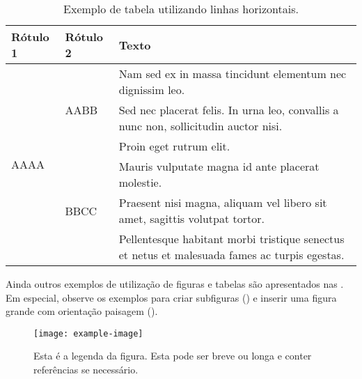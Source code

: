 \documentclass[portuguese]{textolivre}
\begin{document}
\begin{table}[htpb]
\caption{Exemplo de tabela utilizando linhas horizontais.}
\label{tbl02}
\begin{tabular}{llp{11cm}}
\toprule
Rótulo 1 & Rótulo 2 & Texto \\
\midrule
\multirow{6}{*}{AAAA} & \multirow{3}{*}{AABB} & Nam sed ex in massa tincidunt elementum nec dignissim leo.  \\
 \cmidrule{3-3}
 & & Sed nec placerat felis. In urna leo, convallis a nunc non, sollicitudin auctor nisi. \\
 \cmidrule{3-3}
 & & Proin eget rutrum elit. \\
 \cmidrule{2-3}
 & \multirow{3}{*}{BBCC} & Mauris vulputate magna id ante placerat molestie. \\
 \cmidrule{3-3}
 & & Praesent nisi magna, aliquam vel libero sit amet, sagittis volutpat tortor. \\
 \cmidrule{3-3}
 & & Pellentesque habitant morbi tristique senectus et netus et malesuada fames ac turpis egestas. \\
\bottomrule
\end{tabular}
\end{table}

\lipsum[3]

Ainda outros exemplos de utilização de figuras e tabelas são apresentados nas . Em especial, observe os exemplos para criar subfiguras () e inserir uma figura grande com orientação paisagem ().

\begin{figure}[htbp]
\centering
\texttt{[image: example-image]}
\caption{Esta é a legenda da figura. Esta pode ser breve ou longa e conter referências se necessário.}
\label{fig:example}
\end{figure}

\lipsum[30-35]
\end{document}
